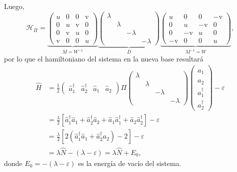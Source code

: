 \documentclass{scrartcl}
\newcommand{\inv}[1]{\frac{1}{#1}}
\renewcommand{\a}{\hat{a}}
\DeclareRobustCommand{\[}{\begin{equation}}
\DeclareRobustCommand{\]}{\end{equation}}
\begin{document}
\begin{enumerate}
\begin{enumerate}
\begin{enumerate}[(i)]
            Luego,
            \[ \mathcal{H}_\Pi = \underbrace{\begin{pmatrix} u & 0 & 0 & \mathrm{v} \\ 0 & u & \mathrm{v} & 0 \\ 0 & \mathrm{v} & u & 0 \\ \mathrm{v} & 0 & 0 & u \end{pmatrix}}_{M = W^{-1}} \underbrace{\begin{pmatrix} \lambda & & & \\ & \lambda & & \\ & & -\lambda & \\ & & & -\lambda \end{pmatrix}}_{D} \underbrace{\begin{pmatrix} u & 0 & 0 & -\mathrm{v} \\ 0 & u & -\mathrm{v} & 0 \\ 0 & -\mathrm{v} & u & 0 \\ -\mathrm{v} & 0 & 0 & u \end{pmatrix}}_{M^{-1} = W}, \]
            por lo que el hamiltoniano del sistema en la nueva base resultará
            \begin{align}
                \hat H &= \inv{2} \begin{pmatrix} \a_1^\dagger & \a_2^\dagger & \a_1 & \a_2 \end{pmatrix} \Pi \begin{pmatrix} \lambda & & & \\ & \lambda & & \\ & & -\lambda & \\ & & & -\lambda \end{pmatrix} \begin{pmatrix} \a_1 \\ \a_2 \\ \a_1^\dagger \\ \a_2^\dagger \end{pmatrix} - \varepsilon \\
                    &= \frac{\lambda}{2} \left[ \a_1^\dagger \a_1 + \a_2^\dagger \a_2 + \a_1 \a_1^\dagger + \a_2 \a_2^\dagger \right] - \varepsilon \\
                    &= \frac{\lambda}{2} \left[ 2 \left(\a_1^\dagger \a_1 + \a_2^\dagger \a_2 \right) - 2 \right] - \varepsilon \\
                    &= \lambda \hat{N} - (\lambda - \varepsilon) = \lambda \hat{N} + E_0,
            \end{align}
            donde $E_0 = -(\lambda - \varepsilon)$ es la energía de vacío del sistema.
            

\end{enumerate}
\end{enumerate}
\end{enumerate}
\end{document}
